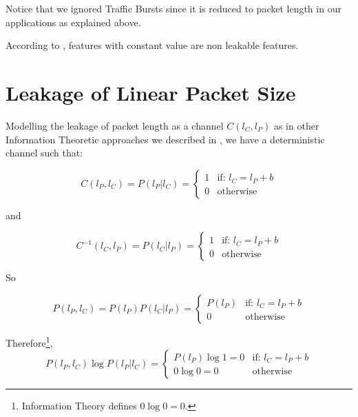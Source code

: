 Notice that we ignored Traffic Bursts since it is reduced to packet length in our applications as explained above.

According to , features with constant value are non leakable features. 

\chapter{Leakage of Linear Packet Size} \label{Linear Leakage}

Modelling the leakage of packet length as a channel $C(l_{C},l_{P})$ as in other Information Theoretic approaches we described in , we have a deterministic channel such that:

\begin{equation}
	C(l_{P}, l_{C}) = P(l_{P} | l_{C}) = 
	\begin{cases}
		1 &\text{if: } l_{C} = l_{P} + b \\
		0 &\text{otherwise}
	\end{cases}
\end{equation}

and

\begin{equation}
	C^{-1}(l_{C}, l_{P}) = P(l_{C} | l_{P}) = 
	\begin{cases}
		1 &\text{if: } l_{C} = l_{P} + b \\
		0 &\text{otherwise}
	\end{cases}
\end{equation}

So

\begin{equation}
	P(l_{P} , l_{C}) = P(l_{P}) P(l_{C} | l_{P}) =
	\begin{cases}
		P(l_{P}) &\text{if: } l_{C} = l_{P} + b \\
		0 &\text{otherwise}
	\end{cases}
\end{equation}

Therefore\footnote{Information Theory defines $0\log{0} = 0$.},
\begin{equation}
	P(l_{P} , l_{C}) \log{P(l_{P} | l_{C})} = 
	\begin{cases}
		P(l_{P})\log{1} = 0 &\text{if: } l_{C} = l_{P} + b \\
		0 \log{0} = 0 &\text{otherwise}
	\end{cases}
\end{equation}

